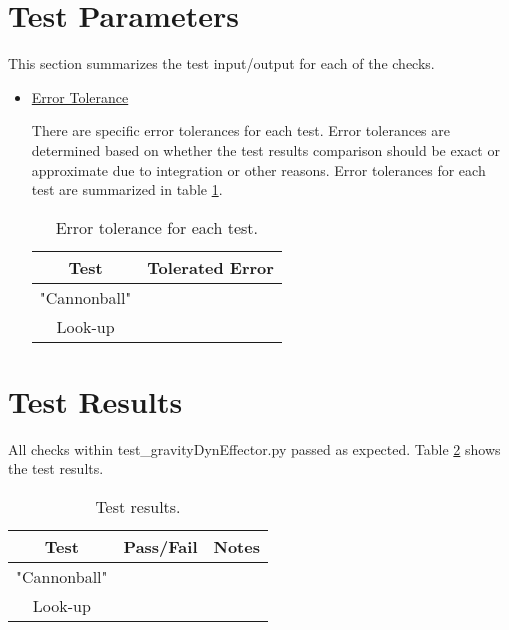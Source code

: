 \documentclass[]{BasiliskReportMemo}
\begin{document}
\section{Test Parameters}

This section summarizes the test input/output for each of the checks. 
\begin{itemize}
\item \underline{Error Tolerance}

There are specific error tolerances for each test. Error tolerances are determined based on whether the test results comparison should be exact or approximate due to integration or other reasons. Error tolerances for each test are summarized in table \ref{tab:errortol}. 

\begin{table}[htbp]
	\caption{Error tolerance for each test.}
	\label{tab:errortol}
	\centering \fontsize{10}{10}\selectfont
	\begin{tabular}{ c | c } %
		\hline
		\textbf{Test}   							& \textbf{Tolerated Error} 						  \\ \hline
		"Cannonball" &		   \\ \hline
		Look-up					& 														   \\ \hline
	\end{tabular}
\end{table}
\end{itemize}

\section{Test Results}

All checks within test\_gravityDynEffector.py passed as expected. Table \ref{tab:results} shows the test results.

\begin{table}[htbp]
	\caption{Test results.}
	\label{tab:results}
	\centering \fontsize{10}{10}\selectfont
	\begin{tabular}{c | c | c  } %
		\hline
		\textbf{Test} 				      & \textbf{Pass/Fail} 						   		   & \textbf{Notes} 									\\ \hline
		"Cannonball"	   			  	&      & 			 \\ \hline
		Look-up	   	                     &              &  \\ \hline
	\end{tabular}
\end{table}
\end{document}
